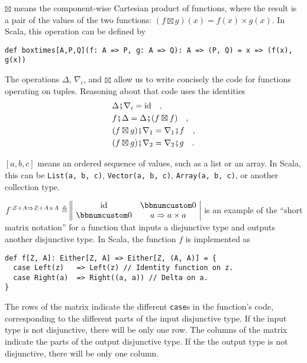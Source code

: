 $\boxtimes$ means the component-wise Cartesian product of functions,
where the result is a pair of the values of the two functions: $(f\boxtimes g)(x)=f(x)\times g(x)$.
In Scala, this operation can be defined by
\begin{lstlisting}
def boxtimes[A,P,Q](f: A => P, g: A => Q): A => (P, Q) = x => (f(x), g(x))
\end{lstlisting}
The operations $\Delta$, $\nabla_{i}$, and $\boxtimes$ allow us
to write concisely the code for functions operating on tuples. Reasoning
about that code uses the identities
\begin{align*}
 & \Delta\bef\nabla_{i}=\text{id}\quad,\\
 & f\bef\Delta=\Delta\bef(f\boxtimes f)\quad,\\
 & (f\boxtimes g)\bef\nabla_{1}=\nabla_{1}\bef f\quad,\\
 & (f\boxtimes g)\bef\nabla_{2}=\nabla_{2}\bef g\quad.
\end{align*}

$\left[a,b,c\right]$ means an ordered sequence of values, such as
a list or an array. In Scala, this can be \lstinline!List(a, b, c)!,
\lstinline!Vector(a, b, c)!,
\lstinline!Array(a, b, c)!,
or another collection type.

$f^{:Z+A\Rightarrow Z+A\times A}\triangleq\begin{array}{||cc|}
\text{id} & \bbnum 0\\
\bbnum 0 & a\Rightarrow a\times a
\end{array}$ is an example of the ``short matrix notation'' for a function that
inputs a disjunctive type and outputs another disjunctive type. In
Scala, the function $f$ is implemented as
\begin{lstlisting}
def f[Z, A]: Either[Z, A] => Either[Z, (A, A)] = {
  case Left(z)   => Left(z) // Identity function on z.
  case Right(a)  => Right((a, a)) // Delta on a.
}
\end{lstlisting}
The rows of the matrix indicate the different \lstinline!case!s
in the function's code, corresponding to the different parts of the
input disjunctive type. If the input type is not disjunctive, there
will be only one row. The columns of the matrix indicate the parts
of the output disjunctive type. If the the output type is not disjunctive,
there will be only one column.

